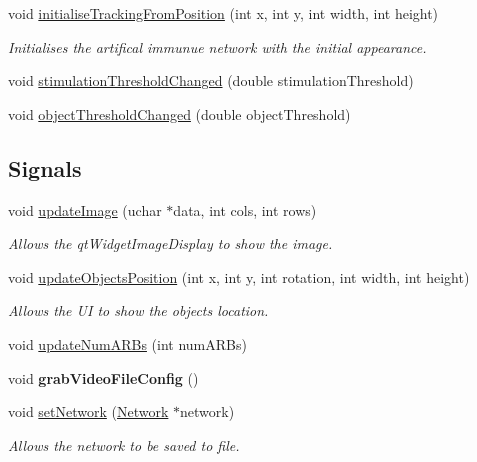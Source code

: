 \begin{DoxyCompactItemize}
\item 
void \hyperlink{class_tracking_and_detection_a8bb8cf4b4bf79c3605c450f0a998ff63}{initialise\+Tracking\+From\+Position} (int x, int y, int width, int height)
\begin{DoxyCompactList}\small\item\em Initialises the artifical immunue network with the initial appearance. \end{DoxyCompactList}\item 
void \hyperlink{class_tracking_and_detection_a8eafd41240df57ed65ae67550f18d540}{stimulation\+Threshold\+Changed} (double stimulation\+Threshold)
\item 
void \hyperlink{class_tracking_and_detection_aa2c2aa4f8901f92b101a99013eb55551}{object\+Threshold\+Changed} (double object\+Threshold)
\end{DoxyCompactItemize}
\subsection*{Signals}
\begin{DoxyCompactItemize}
\item 
void \hyperlink{class_tracking_and_detection_a218aab354939b487503031ddc2b913d3}{update\+Image} (uchar $\ast$data, int cols, int rows)
\begin{DoxyCompactList}\small\item\em Allows the qt\+Widget\+Image\+Display to show the image. \end{DoxyCompactList}\item 
void \hyperlink{class_tracking_and_detection_af709dac7ba7d396a837ae9fe3997dd7a}{update\+Objects\+Position} (int x, int y, int rotation, int width, int height)
\begin{DoxyCompactList}\small\item\em Allows the U\+I to show the objects location. \end{DoxyCompactList}\item 
void \hyperlink{class_tracking_and_detection_a3526dce8ac46f591dde4725d33ba8869}{update\+Num\+A\+R\+Bs} (int num\+A\+R\+Bs)
\item 
\hypertarget{class_tracking_and_detection_a1bce1d598c2d2a53d3f41c0a25b91037}{}void {\bfseries grab\+Video\+File\+Config} ()\label{class_tracking_and_detection_a1bce1d598c2d2a53d3f41c0a25b91037}

\item 
void \hyperlink{class_tracking_and_detection_a96867b74b33b67c0a8ddb4ebd07af60e}{set\+Network} (\hyperlink{class_network}{Network} $\ast$network)
\begin{DoxyCompactList}\small\item\em Allows the network to be saved to file. \end{DoxyCompactList}\end{DoxyCompactItemize}
